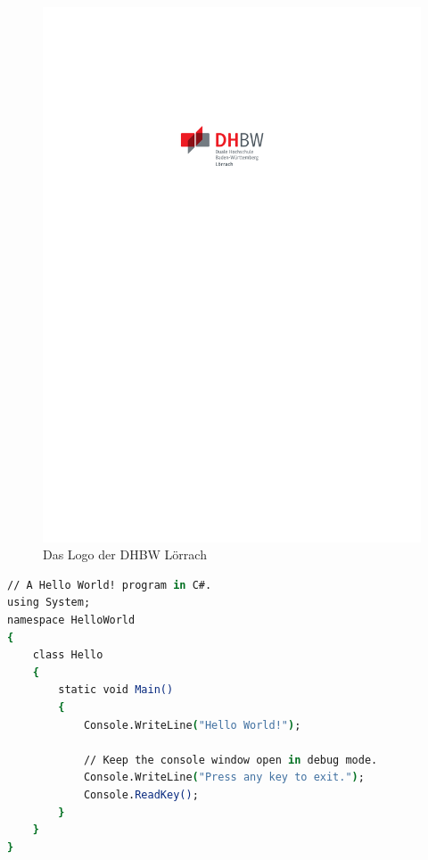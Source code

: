 \begin{figure}[htbp]
    \centering
    \includegraphics[scale=1.6]{figures/DHBW_d_LOE_46mm_4c.pdf}
    \caption{Das Logo der DHBW Lörrach}
    \label{fig:logo}
\end{figure}

\lipsum[1]

\begin{lstlisting}[language=csh]
// A Hello World! program in C#.
using System;
namespace HelloWorld
{
    class Hello
    {
        static void Main()
        {
            Console.WriteLine("Hello World!");

            // Keep the console window open in debug mode.
            Console.WriteLine("Press any key to exit.");
            Console.ReadKey();
        }
    }
}
\end{lstlisting}
